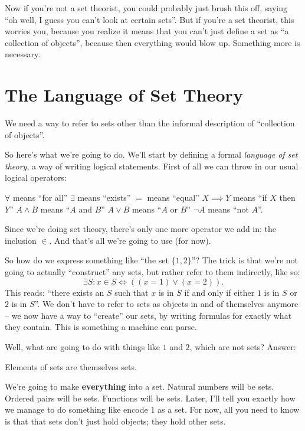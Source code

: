 Now if you're not a set theorist, you could probably just brush this off,
saying ``oh well, I guess you can't look at certain sets''.
But if you're a set theorist, this worries you,
because you realize it means that you can't just define a set as ``a collection of objects'',
because then everything would blow up. Something more is necessary.



\section{The Language of Set Theory}
We need a way to refer to sets other
than the informal description of ``collection of objects''.

So here's what we're going to do.
We'll start by defining a formal \emph{language of set theory},
a way of writing logical statements.
First of all we can throw in our usual logical operators:
\begin{itemize}
	\ii $\forall$ means ``for all''
	\ii $\exists$ means ``exists''
	\ii $=$ means ``equal''
	\ii $X \implies Y$ means ``if $X$ then $Y$''
	\ii $A \land B$ means ``$A$ and $B$''
	\ii $A \lor B$ means ``$A$ or $B$''
	\ii $\neg A$ means ``not $A$''.
\end{itemize}

Since we're doing set theory,
there's only one more operator we add in: the inclusion $\in$.
And that's all we're going to use (for now).

So how do we express something like ``the set $\{1, 2\}$''?
The trick is that we're not going to actually ``construct'' any sets,
but rather refer to them indirectly, like so:
\[ \exists S : x \in S \iff \left( (x=1) \lor (x=2) \right). \]
This reads: ``there exists an $S$ such that $x$ is in $S$ if
and only if either $1$ is in $S$ or $2$ is in $S$''.
We don't have to refer to sets as objects in and of themselves anymore -- we now have a way to ``create'' our sets, by writing formulas for exactly what they contain. This is something a machine can parse.

Well, what are going to do with things like $1$ and $2$, which are not sets? 
Answer:
\begin{moral}
	Elements of sets are themselves sets.
\end{moral}
We're going to make \textbf{everything} into a set. Natural numbers will be sets. Ordered pairs will be sets. Functions will be sets. 
Later, I'll tell you exactly how we manage to do something like encode $1$ as a set. For now, all you need to know is that that sets don't just hold objects; they hold other sets.

